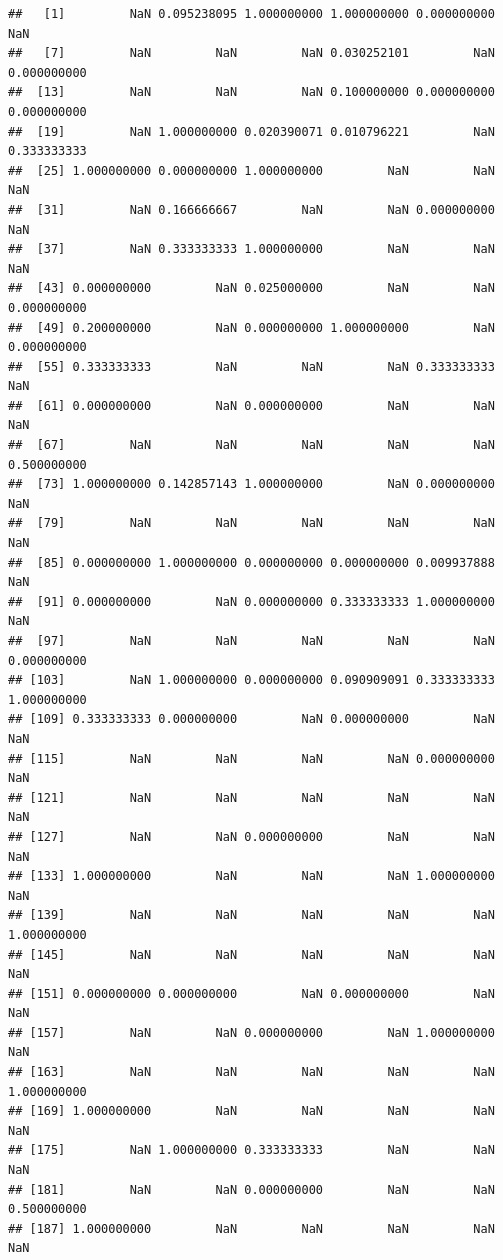 \documentclass[
]{book}
\begin{document}
\begin{verbatim}
##   [1]         NaN 0.095238095 1.000000000 1.000000000 0.000000000         NaN
##   [7]         NaN         NaN         NaN 0.030252101         NaN 0.000000000
##  [13]         NaN         NaN         NaN 0.100000000 0.000000000 0.000000000
##  [19]         NaN 1.000000000 0.020390071 0.010796221         NaN 0.333333333
##  [25] 1.000000000 0.000000000 1.000000000         NaN         NaN         NaN
##  [31]         NaN 0.166666667         NaN         NaN 0.000000000         NaN
##  [37]         NaN 0.333333333 1.000000000         NaN         NaN         NaN
##  [43] 0.000000000         NaN 0.025000000         NaN         NaN 0.000000000
##  [49] 0.200000000         NaN 0.000000000 1.000000000         NaN 0.000000000
##  [55] 0.333333333         NaN         NaN         NaN 0.333333333         NaN
##  [61] 0.000000000         NaN 0.000000000         NaN         NaN         NaN
##  [67]         NaN         NaN         NaN         NaN         NaN 0.500000000
##  [73] 1.000000000 0.142857143 1.000000000         NaN 0.000000000         NaN
##  [79]         NaN         NaN         NaN         NaN         NaN         NaN
##  [85] 0.000000000 1.000000000 0.000000000 0.000000000 0.009937888         NaN
##  [91] 0.000000000         NaN 0.000000000 0.333333333 1.000000000         NaN
##  [97]         NaN         NaN         NaN         NaN         NaN 0.000000000
## [103]         NaN 1.000000000 0.000000000 0.090909091 0.333333333 1.000000000
## [109] 0.333333333 0.000000000         NaN 0.000000000         NaN         NaN
## [115]         NaN         NaN         NaN         NaN 0.000000000         NaN
## [121]         NaN         NaN         NaN         NaN         NaN         NaN
## [127]         NaN         NaN 0.000000000         NaN         NaN         NaN
## [133] 1.000000000         NaN         NaN         NaN 1.000000000         NaN
## [139]         NaN         NaN         NaN         NaN         NaN 1.000000000
## [145]         NaN         NaN         NaN         NaN         NaN         NaN
## [151] 0.000000000 0.000000000         NaN 0.000000000         NaN         NaN
## [157]         NaN         NaN 0.000000000         NaN 1.000000000         NaN
## [163]         NaN         NaN         NaN         NaN         NaN 1.000000000
## [169] 1.000000000         NaN         NaN         NaN         NaN         NaN
## [175]         NaN 1.000000000 0.333333333         NaN         NaN         NaN
## [181]         NaN         NaN 0.000000000         NaN         NaN 0.500000000
## [187] 1.000000000         NaN         NaN         NaN         NaN         NaN

\end{verbatim}
\end{document}
